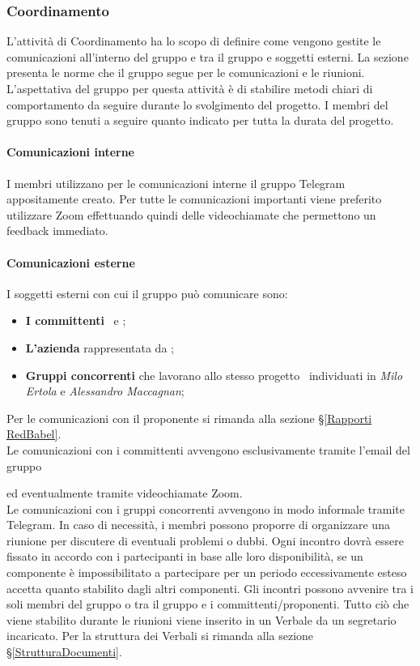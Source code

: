 
\subsubsection{Coordinamento}
\label{PO_Coordinamento_Scopo}
L'attività di Coordinamento ha lo scopo di definire come vengono gestite le comunicazioni all'interno del gruppo \Gruppo e tra il gruppo e soggetti esterni.
La sezione presenta le norme che il gruppo segue per le comunicazioni e le riunioni.
L'aspettativa del gruppo per questa attività è di stabilire metodi chiari di comportamento da seguire durante lo svolgimento del progetto.
 I membri del gruppo sono tenuti a seguire quanto indicato per tutta la durata del progetto.
\paragraph*{Comunicazioni interne}
I membri utilizzano per le comunicazioni interne il gruppo Telegram appositamente creato. Per tutte le comunicazioni importanti viene preferito utilizzare Zoom effettuando quindi delle videochiamate che permettono un feedback immediato.
\paragraph*{Comunicazioni esterne}
I soggetti esterni con cui il gruppo può comunicare sono: 
\begin{itemize}
	\item \textbf{I committenti} \VT\ e \CR;
	\item \textbf{L'azienda \Proponente} rappresentata da ;
	\item \textbf{Gruppi concorrenti} che lavorano allo stesso progetto \NomeProgetto\ individuati in \textit{Milo Ertola} e \textit{Alessandro Maccagnan};
\end{itemize}
Per le comunicazioni con il proponente si rimanda alla sezione \S\ref{Rapporti RedBabel}. \\
Le comunicazioni con i committenti avvengono esclusivamente tramite l'email del gruppo
\begin{center}
	 \textbf{\Mail} 
\end{center} ed eventualmente tramite videochiamate Zoom.\\
Le comunicazioni con i gruppi concorrenti avvengono in modo informale tramite Telegram.
In caso di necessità, i membri possono proporre di organizzare una riunione per discutere di eventuali problemi o dubbi. Ogni incontro dovrà essere fissato in accordo con i partecipanti in base alle loro disponibilità, se un componente è impossibilitato a partecipare per un periodo eccessivamente esteso accetta quanto stabilito dagli altri componenti. Gli incontri possono avvenire tra i soli membri del gruppo o tra il gruppo e i committenti/proponenti. 
Tutto ciò che viene stabilito durante le riunioni viene inserito in un Verbale da un segretario incaricato. Per la struttura dei Verbali si rimanda alla sezione \S\ref{StrutturaDocumenti}.
